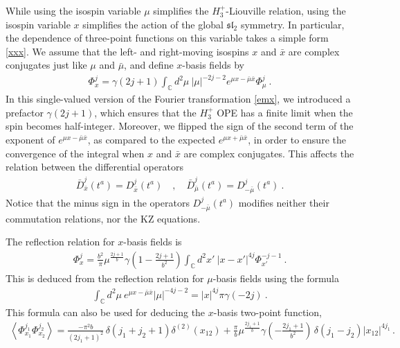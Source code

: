 \documentclass[12pt, a4paper, notitlepage, twoside]{report}
\numberwithin{equation}{section}
\theoremstyle{break}
\begin{document}
While using the isospin variable $\mu$ simplifies the $H_3^+$-Liouville relation, using the isospin variable $x$ simplifies the action of the global $\mathfrak{sl}_2$ symmetry. 
In particular, the dependence of three-point functions on this variable takes a simple form \eqref{xxx}.
We assume that the left- and right-moving isospins $x$ and $\bar x$ are complex conjugates just like $\mu$ and $\bar\mu$, and define $x$-basis fields by 
\begin{align}
 \Phi^j_{x} = \gamma(2j+1)\int_{{\mathbb{C}}} d^2\mu\ |\mu|^{-2j-2} e^{\mu x -\bar{\mu}\bar{x}}\Phi^j_{\mu}\ .
\end{align}
In this single-valued version of the Fourier transformation \eqref{emx}, 
we introduced a prefactor $\gamma(2j+1)$, which ensures that the $H_3^+$ OPE has a finite limit when the spin becomes half-integer.
Moreover, we flipped the sign of the second term of the exponent of $e^{\mu x -\bar{\mu}\bar{x}}$, as compared to the expected $e^{\mu x +\bar{\mu}\bar{x}}$, in order to ensure the convergence of the integral when $x$ and $\bar{x}$ are complex conjugates.
This affects the relation between the differential operators 
\begin{align}
 \bar{D}^j_{\bar{x}}(t^a) = D^j_{\bar{x}}(t^a)  \quad , \quad \bar{D}^j_{\bar{\mu}}(t^a) = D^j_{-\bar{\mu}}(t^a)\ . 
\end{align}
Notice that the minus sign in the operators $D^j_{-\bar{\mu}}(t^a)$ modifies neither their commutation relations, nor the KZ equations.

The reflection relation for $x$-basis fields is
\begin{align}
 \Phi^j_{x} = \frac{b^2}{\pi}\mu^{\frac{2j+1}{b}}\gamma(1-\tfrac{2j+1}{b^2})\int_{{\mathbb{C}}}d^2x'\ |x-x'|^{4j}\Phi^{-j-1}_{x'}\ .
\end{align}
This is deduced from the reflection relation for $\mu$-basis fields using the formula
\begin{align}
 \int_{{\mathbb{C}}}d^2\mu\ e^{\mu x-\bar{\mu}\bar{x}} |\mu|^{-4j-2} = |x|^{4j}\pi \gamma(-2j) \ .
\label{icmx}
\end{align}
This formula can also be used for deducing the $x$-basis two-point function,
\begin{align}
 \left\langle \Phi^{j_1}_{x_1} \Phi^{j_2}_{x_2} \right\rangle = \frac{-\pi^2 b}{(2j_1+1)^2}\, \delta(j_1+j_2+1)\delta^{(2)}(x_{12}) 
+ \frac{\pi}{b}\mu^{\frac{2j_1+1}{b}} \gamma(-\tfrac{2j_1+1}{b^2})\, \delta(j_1-j_2)|x_{12}|^{4j_1}\, .
\label{pjpj}
\end{align}
\end{document}
